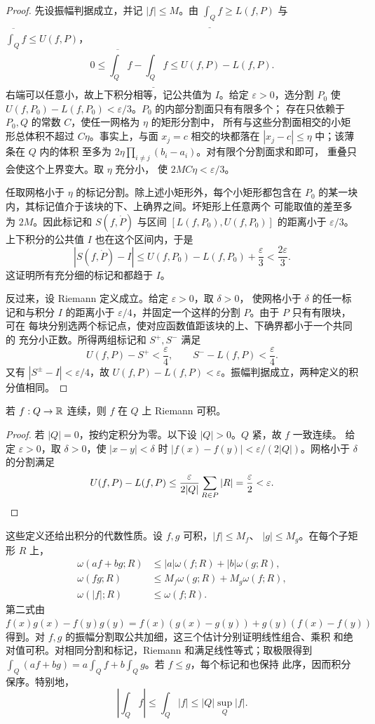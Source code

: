 \begin{proof}
先设振幅判据成立，并记 $|f|\le M$。由
$\underline{\int_Q}f\ge L(f,P)$ 与
$\overline{\int_Q}f\le U(f,P)$，
\[
 0\le \overline{\int_Q}f-\underline{\int_Q}f
 \le U(f,P)-L(f,P).
\]
右端可以任意小，故上下积分相等，记公共值为 $I$。给定
$\varepsilon>0$，选分割 $P_0$
使 $U(f,P_0)-L(f,P_0)<\varepsilon/3$。$P_0$ 的内部分割面只有有限多个；
存在只依赖于 $P_0,Q$ 的常数 $C$，使任一网格为 $\eta$ 的矩形分割中，
所有与这些分割面相交的小矩形总体积不超过 $C\eta$。事实上，与面
$x_j=c$ 相交的块都落在 $|x_j-c|\le\eta$ 中；该薄条在 $Q$ 内的体积
至多为 $2\eta\prod_{i\ne j}(b_i-a_i)$。对有限个分割面求和即可，
重叠只会使这个上界变大。取 $\eta$ 充分小，
使 $2MC\eta<\varepsilon/3$。

任取网格小于 $\eta$ 的标记分割。除上述小矩形外，每个小矩形都包含在
$P_0$ 的某一块内，其标记值介于该块的下、上确界之间。坏矩形上任意两个
可能取值的差至多为 $2M$。因此标记和 $S(f,\dot P)$ 与区间
$[L(f,P_0),U(f,P_0)]$ 的距离小于 $\varepsilon/3$。上下积分的公共值
$I$ 也在这个区间内，于是
\[
 |S(f,\dot P)-I|
 \le U(f,P_0)-L(f,P_0)+\frac{\varepsilon}{3}
 <\frac{2\varepsilon}{3}.
\]
这证明所有充分细的标记和都趋于 $I$。

反过来，设 Riemann 定义成立。给定 $\varepsilon>0$，取 $\delta>0$，
使网格小于 $\delta$ 的任一标记和与积分 $I$ 的距离小于
$\varepsilon/4$，并固定一个这样的分割 $P$。由于 $P$ 只有有限块，可在
每块分别选两个标记点，使对应函数值距该块的上、下确界都小于一个共同的
充分小正数。所得两组标记和 $S^+,S^-$ 满足
\[
 U(f,P)-S^+<\frac{\varepsilon}{4},\qquad
 S^--L(f,P)<\frac{\varepsilon}{4}.
\]
又有 $|S^\pm-I|<\varepsilon/4$，故
$U(f,P)-L(f,P)<\varepsilon$。振幅判据成立，两种定义的积分值相同。
\end{proof}

\begin{theorem}[连续函数可积]
\label{thm:continuous-multiple-riemann-integrable}
若 $f:Q\to\mathbb{R}$ 连续，则 $f$ 在 $Q$ 上 Riemann 可积。
\end{theorem}

\begin{proof}
若 $|Q|=0$，按约定积分为零。以下设 $|Q|>0$。$Q$ 紧，故 $f$ 一致连续。
给定 $\varepsilon>0$，取 $\delta>0$，使
$|x-y|<\delta$ 时 $|f(x)-f(y)|<\varepsilon/(2|Q|)$。网格小于
$\delta$ 的分割满足
\[
 U(f,P)-L(f,P)
 \le \frac{\varepsilon}{2|Q|}\sum_{R\in P}|R|=\frac\varepsilon2<\varepsilon.\qedhere
\]
\end{proof}

这些定义还给出积分的代数性质。设 $f,g$ 可积，$|f|\le M_f$、
$|g|\le M_g$。在每个子矩形 $R$ 上，
\begin{align*}
 \omega(af+bg;R)&\le |a|\omega(f;R)+|b|\omega(g;R),\\
 \omega(fg;R)&\le M_f\omega(g;R)+M_g\omega(f;R),\\
 \omega(|f|;R)&\le\omega(f;R).
\end{align*}
第二式由 $f(x)g(x)-f(y)g(y)=f(x)(g(x)-g(y))+g(y)(f(x)-f(y))$
得到。对 $f,g$ 的振幅分割取公共加细，这三个估计分别证明线性组合、乘积
和绝对值可积。对相同分割和标记，Riemann 和满足线性等式；取极限得到
$\int_Q(af+bg)=a\int_Qf+b\int_Qg$。若 $f\le g$，每个标记和也保持
此序，因而积分保序。特别地，
\[
 \left|\int_Qf\right|\le\int_Q|f|\le |Q|\sup_Q|f|.
\]

